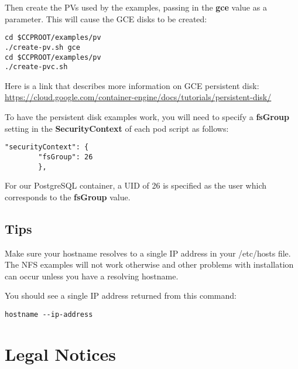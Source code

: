 \documentclass[letterpaper,12pt]{article}
\let\stdsection\section
\renewcommand\section{\newpage\stdsection}
\begin{document}
Then create the PVs used by the examples, passing in the \textbf{gce} value as a parameter. This will cause the GCE disks to be created:
\vspace{.75em}
\begin{lstlisting}
cd $CCPROOT/examples/pv
./create-pv.sh gce
cd $CCPROOT/examples/pv
./create-pvc.sh
\end{lstlisting}

Here is a link that describes more information on GCE persistent disk: \href{https://cloud.google.com/container-engine/docs/tutorials/persistent-disk/}{https://cloud.google.com/container-engine/docs/tutorials/persistent-disk/}

To have the persistent disk examples work, you will need to specify a \textbf{fsGroup} setting in the \textbf{SecurityContext} of each pod script as follows:
\vspace{.75em}
\begin{lstlisting}
"securityContext": {
        "fsGroup": 26
        },
\end{lstlisting}

For our PostgreSQL container, a UID of 26 is specified as the user which corresponds to the \textbf{fsGroup} value.

\subsection{Tips}\label{/_kubernetes_environment/_tips}

Make sure your hostname resolves to a single IP address in your /etc/hosts file. The NFS examples will not work otherwise and other problems with installation can occur unless you have a resolving hostname.

You should see a single IP address returned from this command:
\vspace{.75em}
\begin{lstlisting}
hostname --ip-address
\end{lstlisting}

\section{Legal Notices}\label{/_legal_notices}
\end{document}
